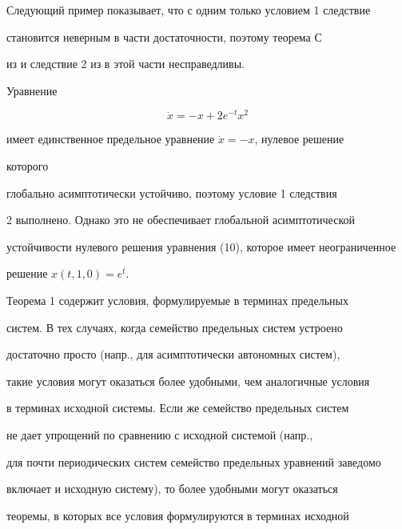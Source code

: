  


Следующий пример показывает, что с одним только условием 1 следствие 


становится неверным в части достаточности, поэтому теорема С 


из \cite{Art2} и следствие 2 из \cite{Kal} в этой части несправедливы. 


 




\begin{exam} Уравнение 


\begin{equation} 


\Dot x=-x+2e^{-t}x^2 


\end{equation} 


имеет единственное предельное уравнение $\Dot x=-x$, нулевое решение 


которого 


глобально асимптотически устойчиво, поэтому условие 1 следствия 


2 выполнено. Однако это не обеспечивает глобальной асимптотической 


устойчивости нулевого решения уравнения (10), которое имеет неограниченное 


решение $x(t,1,0)=e^t$. 


\end{exam} 


 


Теорема 1 содержит условия, формулируемые в терминах предельных 


систем. В тех случаях, когда семейство предельных систем устроено 


достаточно просто (напр., для асимптотически автономных систем), 


такие условия могут оказаться более удобными, чем аналогичные условия 


в терминах исходной системы. Если же семейство предельных систем 


не дает упрощений по сравнению с исходной системой (напр., 


для почти периодических систем семейство предельных уравнений заведомо 


включает и исходную систему), то более удобными могут оказаться 


теоремы, в которых все условия формулируются в терминах исходной 



